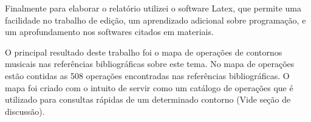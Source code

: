 \documentclass[11pt]{article}
\begin{document}
Finalmente para elaborar o relatório utilizei o software Latex, que
permite uma facilidade no trabalho de edição, um aprendizado adicional
sobre programação, e um aprofundamento nos softwares citados em
materiais.

\label{sec:resultados}


O principal resultado deste trabalho foi o mapa de operações de contornos musicais nas
referências bibliográficas sobre este tema. No mapa de operações estão contidas as 508 operações
encontradas nas referências bibliográficas. O mapa foi criado com o intuito de
servir como um catálogo de operações que é utilizado para consultas rápidas
de um determinado contorno (Vide seção de discussão).
\end{document}
